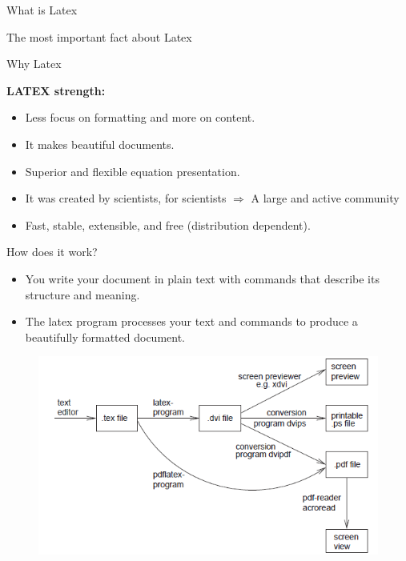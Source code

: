 \documentclass[handout]{beamer}
\begin{document}
\begin{darkframes}
\begin{frame}[<+->]{What is Latex}
\begin{block}{The most important fact about Latex}
\begin{itemize}
   		\end{itemize}
   	\end{block}
   \end{frame}
   
   
   \begin{frame}[<+->]{Why Latex}
   	
   	\begin{block}{\textbf {LATEX strength:}}
   		\begin{itemize}
   			\item Less focus on formatting and more on content.
   			\item It makes beautiful documents.
   			\item Superior and flexible equation presentation.
   			\item It was created by scientists, for scientists $\Rightarrow$ A large and active community
   			\item Fast, stable, extensible, and free (distribution dependent).
   		\end{itemize}
   	\end{block}
   \end{frame}
   
   \begin{frame}{How does it work?}
   	
   	
   	\begin{itemize}
   		\item You write your document in plain text with commands that describe its structure and meaning.
   		\item  The latex program processes your text and commands to produce a beautifully formatted document.
   	\end{itemize}
   	\pause
   	\begin{figure}
   		\includegraphics[scale=0.45]{images/latexhowthis}
   	\end{figure}
   \end{frame}
   

\end{darkframes}
\end{document}
